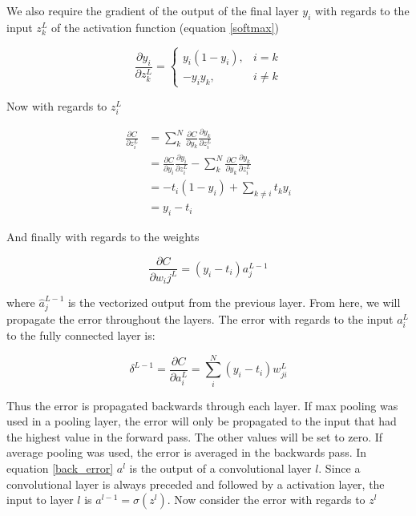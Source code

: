 \documentclass[english, a4paper]{report}
\begin{document}
We also require the gradient of the output of the final layer $y_i$ with regards to the input $z_k^L$ of the activation function (equation \ref{softmax})

\begin{equation}
  \frac{\partial y_i}{\partial z_k^L} = 
  \begin{cases}
      y_i(1 - y_i), & i = k\\
      -y_iy_k, & i \ne k
  \end{cases}
\end{equation}

Now with regards to $z_i^L$

\begin{equation}
  \begin{aligned}
  \frac{\partial C}{\partial z_i^L} &= \sum_k^N \frac{\partial C}{\partial y_k}\frac{\partial y_k}{\partial z_i^L} \\
  &= \frac{\partial C}{\partial y_i}\frac{\partial y_i}{\partial z_i^L} - \sum_k^N \frac{\partial C}{\partial y_k}\frac{\partial y_k}{\partial z_i^L} \\
  &= -t_i(1 - y_i) + \sum_{k \ne i}t_ky_i \\
  &= y_i - t_i
  \end{aligned}
\end{equation}

And finally with regards to the weights

\begin{equation}
   \frac{\partial C}{\partial w_ij^L} = (y_i - t_i)a_j^{L-1}
\end{equation}

where $\hat{a}_{j}^{L-1}$ is the vectorized output from the previous layer. From here, we will propagate the error throughout the layers. The error with regards to the input $a_i^L$ to the fully connected layer is:

\begin{equation} %
  \delta^{L-1} = \frac{\partial C}{\partial a_i^L} = \sum_i^N (y_i - t_i)w_{ji}^{L}
  \label{back_error}
\end{equation}

Thus the error is propagated backwards through each layer. If max pooling was used in a pooling layer, the error will only be propagated to the input that had the highest value in the forward pass. The other values will be set to zero. If average pooling was used, the error is averaged in the backwards pass.
In equation \ref{back_error} $a^l$ is the output of a convolutional layer $l$. Since a convolutional layer is always preceded and followed by a activation layer, the input to layer $l$ is $a^{l-1} = \sigma(z^l)$. Now consider the error with regards to $z^l$
\end{document}
